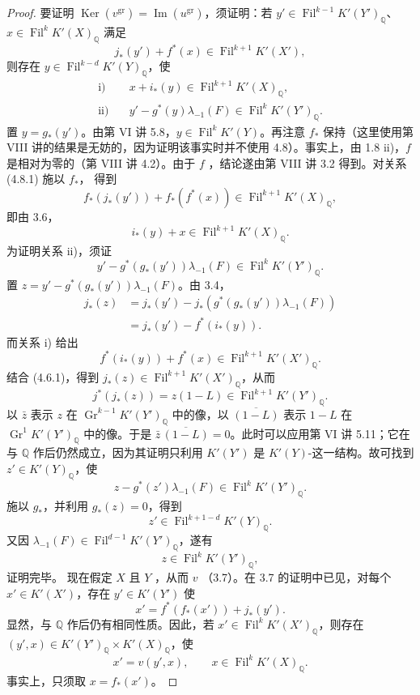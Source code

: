 \begin{proof}
要证明 $\operatorname{Ker}(v^{\mathrm{gr}})=\operatorname{Im}(u^{\mathrm{gr}})$，须证明：若 $y'\in\operatorname{Fil}^{k-1}K'(Y')_{\mathbb Q}$、$x\in\operatorname{Fil}^kK'(X)_{\mathbb Q}$ 满足
\[
j_*(y')+f^*(x)\in\operatorname{Fil}^{k+1}K'(X'),\tag{4.6.1}
\]
则存在 $y\in\operatorname{Fil}^{k-d}K'(Y)_{\mathbb Q}$，使
\[
\begin{aligned}
\text{i)}\quad&x+i_*(y)\in\operatorname{Fil}^{k+1}K'(X)_{\mathbb Q},\\
\text{ii)}\quad&y'-g^*(y)\lambda_{-1}(F)\in\operatorname{Fil}^kK'(Y')_{\mathbb Q}.
\end{aligned}
\]
置 $y=g_*(y')$。由第 VI 讲 5.8，$y\in\operatorname{Fil}^kK'(Y)$。再注意 $f_*$ 保持（这里使用第 VIII 讲的结果是无妨的，因为证明该事实时并不使用 4.8）。事实上，由 1.8 ii)，$f$ 是相对为零的（第 VIII 讲 4.2）。由于 $f$ ，结论遂由第 VIII 讲 3.2 得到。对关系 (4.8.1) 施以 $f_*$，
得到
\[
f_*(j_*(y'))+f_*(f^*(x))\in\operatorname{Fil}^{k+1}K'(X)_{\mathbb Q},
\]
即由 3.6，
\[
i_*(y)+x\in\operatorname{Fil}^{k+1}K'(X)_{\mathbb Q}.
\]
为证明关系 ii)，须证
\[
y'-g^*(g_*(y'))\lambda_{-1}(F)\in\operatorname{Fil}^kK'(Y')_{\mathbb Q}.
\]
置 $z=y'-g^*(g_*(y'))\lambda_{-1}(F)$。由 3.4，
\[
\begin{aligned}
j_*(z)&=j_*(y')-j_*(g^*(g_*(y'))\lambda_{-1}(F))\\
&=j_*(y')-f^*(i_*(y)).
\end{aligned}
\]
而关系 i) 给出
\[
f^*(i_*(y))+f^*(x)\in\operatorname{Fil}^{k+1}K'(X')_{\mathbb Q}.
\]
结合 (4.6.1)，得到 $j_*(z)\in\operatorname{Fil}^{k+1}K'(X')_{\mathbb Q}$，从而
\[
j^*(j_*(z))=z(1-L)\in\operatorname{Fil}^{k+1}K'(Y')_{\mathbb Q}.
\]
以 $\bar z$ 表示 $z$ 在 $\operatorname{Gr}^{k-1}K'(Y')_{\mathbb Q}$ 中的像，以 $\overline{(1-L)}$ 表示 $1-L$ 在 $\operatorname{Gr}^1K'(Y')_{\mathbb Q}$ 中的像。于是 $\bar z\,\overline{(1-L)}=0$。此时可以应用第 VI 讲 5.11；它在与 $\mathbb Q$ 作后仍然成立，因为其证明只利用 $K'(Y')$ 是 $K'(Y)$-这一结构。故可找到 $z'\in K'(Y)_{\mathbb Q}$，使
\[
z-g^*(z')\lambda_{-1}(F)\in\operatorname{Fil}^kK'(Y')_{\mathbb Q}.
\]
施以 $g_*$，并利用 $g_*(z)=0$，得到
\[
z'\in\operatorname{Fil}^{k+1-d}K'(Y)_{\mathbb Q}.
\]
又因 $\lambda_{-1}(F)\in\operatorname{Fil}^{d-1}K'(Y')_{\mathbb Q}$，遂有
\[
z\in\operatorname{Fil}^kK'(Y')_{\mathbb Q},
\]
证明完毕。
现在假定 $X$ 且 $Y$ ，从而 $v$ （3.7）。在 3.7 的证明中已见，对每个 $x'\in K'(X')$，存在 $y'\in K'(Y')$ 使
\[
x'=f^*(f_*(x'))+j_*(y').
\]
显然，与 $\mathbb Q$ 作后仍有相同性质。因此，若 $x'\in\operatorname{Fil}^kK'(X')_{\mathbb Q}$，则存在 $(y',x)\in K'(Y')_{\mathbb Q}\times K'(X)_{\mathbb Q}$，使
\[
x'=v(y',x),\qquad x\in\operatorname{Fil}^kK'(X)_{\mathbb Q}.
\]
事实上，只须取 $x=f_*(x')$。


\end{proof}
